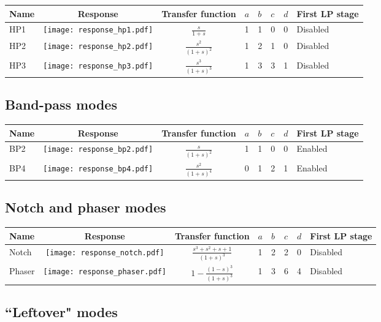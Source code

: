 \documentclass[a4paper,10pt]{article}
\begin{document}
\begin{tabular}{lcclllll}
\hline
Name & Response & Transfer function & $a$ & $b$ & $c$ & $d$ & First LP stage \\
\hline
HP1 & \texttt{[image: response\_hp1.pdf]} & $\frac{s}{1 + s}$ & 1 & 1 & 0 & 0 & Disabled \\
\hline
HP2 & \texttt{[image: response\_hp2.pdf]} & $\frac{s^2}{(1 + s)^2}$ & 1 & 2 & 1 & 0 & Disabled \\
\hline
HP3 & \texttt{[image: response\_hp3.pdf]} & $\frac{s^3}{(1 + s)^3}$ & 1 & 3 & 3 & 1 & Disabled \\
\hline
\end{tabular}

\subsection{Band-pass modes}

\begin{tabular}{lcclllll}
\hline
Name & Response & Transfer function & $a$ & $b$ & $c$ & $d$ & First LP stage \\
\hline
BP2 & \texttt{[image: response\_bp2.pdf]} & $\frac{s}{(1 + s)^2}$ & 1 & 1 & 0 & 0 & Enabled \\
\hline
BP4 & \texttt{[image: response\_bp4.pdf]} & $\frac{s^2}{(1 + s)^4}$ & 0 & 1 & 2 & 1 & Enabled \\
\hline
\end{tabular}

\subsection{Notch and phaser modes}

\begin{tabular}{lcclllll}
\hline
Name & Response & Transfer function & $a$ & $b$ & $c$ & $d$ & First LP stage \\
\hline
Notch & \texttt{[image: response\_notch.pdf]} & $\frac{s^3 + s^2 + s + 1}{(1 + s)^3}$ & 1 & 2 & 2 & 0 & Disabled \\
\hline
Phaser & \texttt{[image: response\_phaser.pdf]} & $1 - \frac{(1 - s)^3}{(1 + s)^3}$ & 1 & 3 & 6 & 4 & Disabled \\
\hline
\end{tabular}

\subsection{``Leftover" modes}
\end{document}
